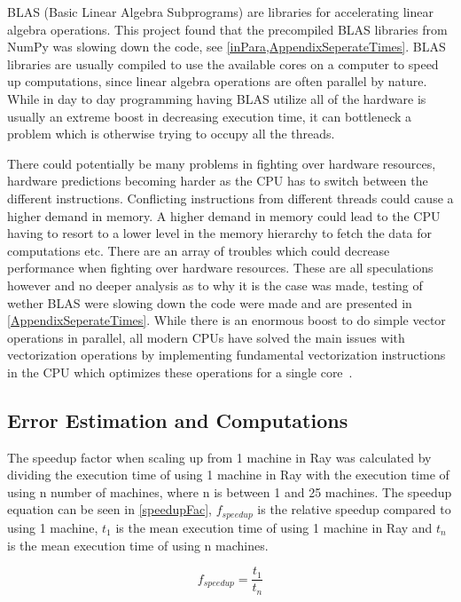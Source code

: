 \documentclass[12pt, a4paper]{article}
\begin{document}
BLAS (Basic Linear Algebra Subprograms) are libraries for accelerating linear algebra operations.
This project found that the precompiled BLAS libraries from NumPy was slowing down the code, see \cref{inPara,AppendixSeperateTimes}.
BLAS libraries are usually compiled to use the available cores on a computer to speed up computations, since linear algebra operations are often parallel by nature.
While in day to day programming having BLAS utilize all of the hardware is usually an extreme boost in decreasing execution time, it can bottleneck a problem which is otherwise trying to occupy all the threads.

There could potentially be many problems in fighting over hardware resources, hardware predictions becoming harder as the CPU has to switch between the different instructions.
Conflicting instructions from different threads could cause a higher demand in memory.
A higher demand in memory could lead to the CPU having to resort to a lower level in the memory hierarchy to fetch the data for computations etc. 
There are an array of troubles which could decrease performance when fighting over hardware resources.
These are all speculations however and no deeper analysis as to why it is the case was made, testing of wether BLAS were slowing down the code were made and are presented in \cref{AppendixSeperateTimes}.
While there is an enormous boost to do simple vector operations in parallel, all modern CPUs have solved the main issues with vectorization operations by implementing fundamental vectorization instructions in the CPU which optimizes these operations for a single core~\cite{enwiki:avx}.

\subsection{Error Estimation and Computations}

The speedup factor when scaling up from 1 machine in Ray was calculated by dividing the execution time of using 1 machine in Ray with the execution time of using n number of machines, where n is between 1 and 25 machines.
The speedup equation can be seen in \cref{speedupFac}, $f_{speedup}$ is the relative speedup compared to using 1 machine, $t_1$ is the mean execution time of using 1 machine in Ray and $t_n$ is the mean execution time of using n machines.

\begin{equation}\label{speedupFac}
    f_{speedup} = \frac{t_1}{t_n}
\end{equation}
\end{document}
